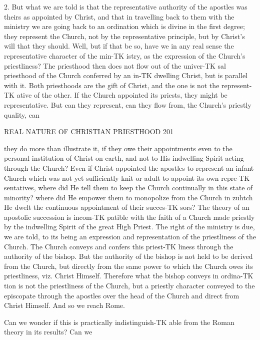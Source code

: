 \documentclass[12pt,a5paper,oneside]{book}
\begin{document}
{{2. But what we are told is that the representative 
authority of the apostles was theirs as appointed by 
Christ, and that in travelling back to them with the 
ministry we are going back to an ordination which is 
divine in the first degree; they represent the Church, 
not by the representative principle, but by Christ's will 
that they should. Well, but if that be so, have we in 
any real sense the representative character of the min-TK
istry, as the expression of the Church's priestliness? 
The priesthood then does not flow out of the univer-TK
sal priesthood of the Church conferred by an in-TK
dwelling Christ, but is parallel with it. Both priesthoods 
are the gift of Christ, and the one is not the represent-TK
ative of the other. If the Church appointed its priests, 
they might be representative. But can they represent, 
can they flow from, the Church's priestly quality, can 



REAL NATURE OF CHRISTIAN PRIESTHOOD 201 

they do more than illustrate it, if they owe their 
appointments even to the personal institution of Christ 
on earth, and not to His indwelling Spirit acting 
through the Church? Even if Christ appointed the 
apostles to represent an infant Church which was not 
yet sufficiently knit or adult to appoint its own repre-TK
sentatives, where did He tell them to keep the Church 
continually in this state of minority? where did He 
empower them to monopolize from the Church in zuhtch 
He dwelt the continuous appointment of their succes-TK
sors? The theory of an apostolic succession is incom-TK
patible with the faith of a Church made priestly by the 
indwelling Spirit of the great High Priest. The right 
of the ministry is due, we are told, to its being an 
expression and representation of the priestliness of the 
Church. The Church conveys and confers this priest-TK
liness through the authority of the bishop. But the 
authority of the bishop is not held to be derived from 
the Church, but directly from the same power to 
which the Church owes its priestliness, viz. Christ 
Himself. Therefore what the bishop conveys in ordina-TK
tion is not the priestliness of the Church, but a priestly 
character conveyed to the episcopate through the 
apostles over the head of the Church and direct from 
Christ Himself. And so we reach Rome. 

Can we wonder if this is practically indistinguish-TK
able from the Roman theory in its results? Can we 



}}
\end{document}
